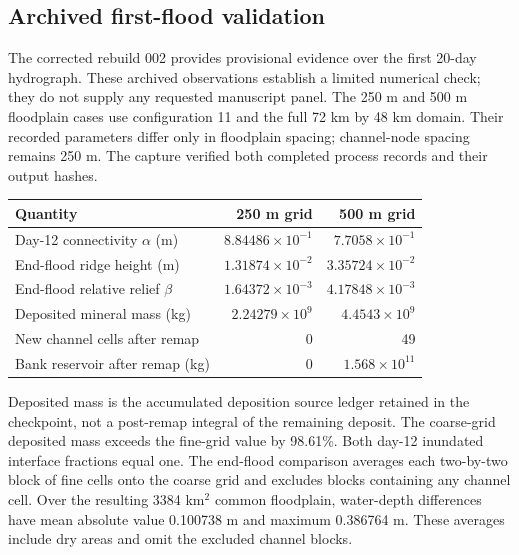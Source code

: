 \subsection{Archived first-flood validation}
\label{sec:first-flood-validation}
The corrected rebuild 002 provides provisional evidence over the first
20-day hydrograph. These archived observations establish a limited
numerical check; they do not supply any requested manuscript panel.
The 250 m and 500 m floodplain cases use configuration 11 and the full
72 km by 48 km domain. Their recorded parameters differ only in
floodplain spacing; channel-node spacing remains 250 m. The capture
verified both completed process records and their output hashes.

\begin{center}\small
\begin{tabular}{lrr}
\toprule
Quantity & 250 m grid & 500 m grid \\
\midrule
Day-12 connectivity $\alpha$ (m) & $8.84486\times10^{-1}$ & $7.7058\times10^{-1}$ \\
End-flood ridge height (m) & $1.31874\times10^{-2}$ & $3.35724\times10^{-2}$ \\
End-flood relative relief $\beta$ & $1.64372\times10^{-3}$ & $4.17848\times10^{-3}$ \\
Deposited mineral mass (kg) & $2.24279\times10^{9}$ & $4.4543\times10^{9}$ \\
New channel cells after remap & 0 & 49 \\
Bank reservoir after remap (kg) & $0$ & $1.568\times10^{11}$ \\
\bottomrule\end{tabular}\end{center}
Deposited mass is the accumulated deposition source ledger retained
in the checkpoint, not a post-remap integral of the remaining deposit.
The coarse-grid deposited mass exceeds the fine-grid value by
98.61\%. Both day-12 inundated interface fractions equal one.
The end-flood comparison averages each two-by-two block of fine cells
onto the coarse grid and excludes blocks containing any channel cell.
Over the resulting 3384 km$^2$ common floodplain, water-depth differences
have mean absolute value 0.100738 m and maximum 0.386764 m.
These averages include dry areas and omit the excluded channel blocks.


